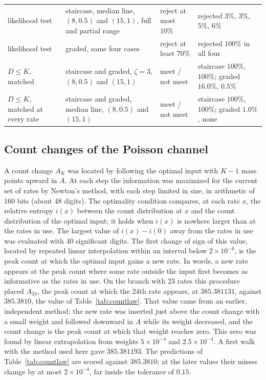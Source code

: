 \begin{table}[tp]
\begin{tabular}{>{\raggedright\arraybackslash}p{3.0cm}>{\raggedright\arraybackslash}p{5.0cm}>{\raggedright\arraybackslash}p{2.2cm}>{\raggedright\arraybackslash}p{3.6cm}}
likelihood test & staircase, median line, $(8,0.5)$ and $(15,1)$, full and partial range & reject at most $10\%$ & rejected $3\%$, $3\%$, $5\%$, $6\%$\\
likelihood test & graded, same four cases & reject at least $70\%$ & rejected $100\%$ in all four\\
$D\le K$, matched & staircase and graded, $\zeta=3$, $(8,0.5)$ and $(15,1)$ & meet / not meet & staircase $100\%$, $100\%$; graded $16.0\%$, $0.5\%$\\
$D\le K$, matched at every rate & staircase and graded, median line, $(8,0.5)$ and $(15,1)$ & meet / not meet & staircase $100\%$, $100\%$; graded $1.0\%$, none\\
\hline
\end{tabular}
\end{table}

\subsection{Count changes of the Poisson channel}
A count change $A_K$ was located by following the optimal input with $K-1$ mass points upward in $A$. At each step the information was
maximized for the current set of rates by Newton's method, with each step limited in size, in arithmetic of 160 bits (about 48
digits). The optimality condition compares, at
each rate $x$, the relative entropy $i(x)$ between the count distribution at $x$ and the count distribution of the optimal input; it
holds when $i(x)$ is nowhere larger than at the rates in use. The largest value of $i(x)-i(0)$ away from the rates in use was
evaluated with 40 significant digits. The first change of sign of this value, located by repeated linear interpolation within an interval below
$2\times10^{-6}$, is the peak count at which the optimal input gains a new rate. In words, a new rate appears at the peak count
where some rate outside the input first becomes as informative as the rates in use. On the branch with 23 rates this procedure
placed $A_{24}$, the peak count at which the 24th rate appears, at $385.381131$, against $385.3810$, the value of
Table~\ref{tab:countlaw}. That value came from an earlier, independent method: the new rate was inserted just above the count
change with a small weight and followed downward in $A$ while its weight decreased, and the count change is the peak count at which
that weight reaches zero. This zero was found by linear extrapolation from weights $5\times10^{-4}$ and $2.5\times10^{-4}$. A first walk with the
method used here gave $385.381193$. The predictions of Table~\ref{tab:countlaw} are scored against $385.3810$; at the later values
their misses change by at most $2\times10^{-4}$, far inside the tolerance of $0.15$.

